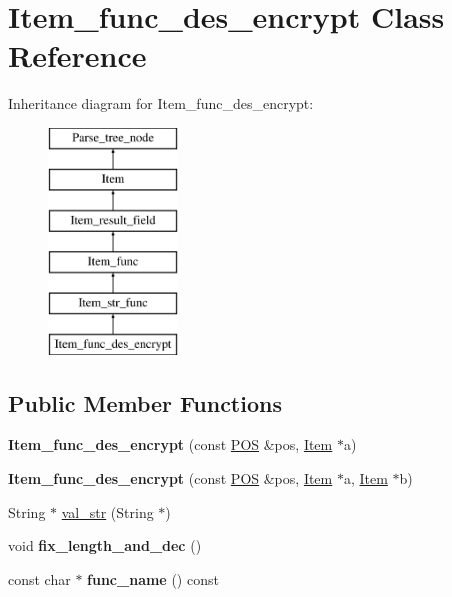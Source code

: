 \hypertarget{classItem__func__des__encrypt}{}\section{Item\+\_\+func\+\_\+des\+\_\+encrypt Class Reference}
\label{classItem__func__des__encrypt}
Inheritance diagram for Item\+\_\+func\+\_\+des\+\_\+encrypt\+:\begin{figure}[H]
\begin{center}
\leavevmode
\includegraphics[height=6.000000cm]{classItem__func__des__encrypt}
\end{center}
\end{figure}
\subsection*{Public Member Functions}
\begin{DoxyCompactItemize}
\item 
\mbox{\label{classItem__func__des__encrypt_a66e71e05394a769e0d8411d3dd3eb538}} 
{\bfseries Item\+\_\+func\+\_\+des\+\_\+encrypt} (const \mbox{\hyperlink{structYYLTYPE}{P\+OS}} \&pos, \mbox{\hyperlink{classItem}{Item}} $\ast$a)
\item 
\mbox{\label{classItem__func__des__encrypt_a6550940fcb86513cd20fb9c38afae76c}} 
{\bfseries Item\+\_\+func\+\_\+des\+\_\+encrypt} (const \mbox{\hyperlink{structYYLTYPE}{P\+OS}} \&pos, \mbox{\hyperlink{classItem}{Item}} $\ast$a, \mbox{\hyperlink{classItem}{Item}} $\ast$b)
\item 
String $\ast$ \mbox{\hyperlink{classItem__func__des__encrypt_a6f5d91012ab3f03cfc2265ba28c4e5f1}{val\+\_\+str}} (String $\ast$)
\item 
\mbox{\label{classItem__func__des__encrypt_a3aa38dbf08672de52ebe472ae5cd8b79}} 
void {\bfseries fix\+\_\+length\+\_\+and\+\_\+dec} ()
\item 
\mbox{\label{classItem__func__des__encrypt_a91ac1dace5b640604132d8d5a45d51e5}} 
const char $\ast$ {\bfseries func\+\_\+name} () const
\end{DoxyCompactItemize}
